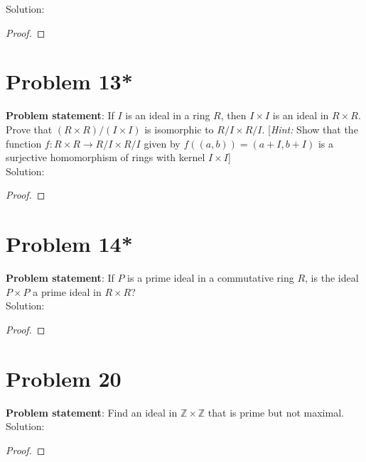 \documentclass{article} %
\begin{document}
Solution: 
\begin{addmargin}[1em]{0em}
\begin{proof}

\end{proof}
\end{addmargin}

\newpage

\section*{Problem 13*}


\textbf{Problem statement}: If $I$ is an ideal in a ring $R$, then $I \times I$ is an ideal in $R \times R$.  Prove that $(R \times R)/(I \times I)$ is isomorphic to $R/I \times R/I$. [\textit{Hint:} Show that the function $f: R \times R \rightarrow R/I \times R/I$ given by $f((a,b)) = (a + I, b + I)$ is a surjective homomorphism of rings with kernel $I \times I$]
\\

Solution: 
\begin{addmargin}[1em]{0em}
\begin{proof}

\end{proof}
\end{addmargin}

\newpage

\section*{Problem 14*}


\textbf{Problem statement}: If $P$ is a prime ideal in a commutative ring $R$, is the ideal $P \times P$ a prime ideal in $R \times R$?
\\

Solution: 
\begin{addmargin}[1em]{0em}
\begin{proof}

\end{proof}
\end{addmargin}

\newpage

\section*{Problem 20}


\textbf{Problem statement}: Find an ideal in $\mathbb{Z} \times \mathbb{Z}$ that is prime but not maximal.
\\

Solution: 
\begin{addmargin}[1em]{0em}
\begin{proof}

\end{proof}
\end{addmargin}

\newpage
\end{document}
